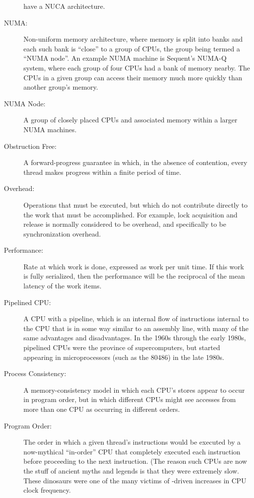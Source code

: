 \begin{description}
	have a NUCA architecture.
\item[NUMA:]
	Non-uniform memory architecture, where memory is split into
	banks and each such bank is ``close'' to a group of CPUs,
	the group being termed a ``NUMA node''.
	An example NUMA machine is Sequent's NUMA-Q system, where
	each group of four CPUs had a bank of memory nearby.
	The CPUs in a given group can access their memory much
	more quickly than another group's memory.
\item[NUMA Node:]
	A group of closely placed CPUs and associated memory within
	a larger NUMA machines.
\item[Obstruction Free:]
	A forward-progress guarantee in which, in the absence of
	contention, every thread makes progress within a finite
	period of time.
\item[Overhead:]
	Operations that must be executed, but which do not contribute
	directly to the work that must be accomplished.
	For example, lock acquisition and release is normally considered
	to be overhead, and specifically to be synchronization overhead.
\item[Performance:]
	Rate at which work is done, expressed as work per unit time.
	If this work is fully serialized, then the performance will
	be the reciprocal of the mean latency of the work items.
\item[Pipelined CPU:]
	A CPU with a pipeline, which is
	an internal flow of instructions internal to the CPU that
	is in some way similar to an assembly line, with many of
	the same advantages and disadvantages.
	In the 1960s through the early 1980s, pipelined CPUs were the
	province of supercomputers, but started appearing in microprocessors
	(such as the 80486) in the late 1980s.
\item[Process Consistency:]
	A memory-consistency model in which each CPU's stores appear to
	occur in program order, but in which different CPUs might see
	accesses from more than one CPU as occurring in different orders.
\item[Program Order:]
	The order in which a given thread's instructions
	would be executed by a now-mythical ``in-order'' CPU that
	completely executed each instruction before proceeding to
	the next instruction.
	(The reason such CPUs are now the stuff of ancient myths
	and legends is that they were extremely slow.
	These dinosaurs were one of the many victims of
	-driven increases in CPU clock frequency.

\end{description}
